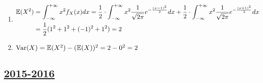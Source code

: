\begin{enumerate}
\begin{enumerate}
\item  \begin{align*}
\operatorname{\mathbb{E}}(X^2) &= \int_{-\infty}^{+\infty} x^2 f_X (x) dx  =
\frac{1}{2} \cdot \int_{-\infty}^{+\infty} x^2 \frac{1}{\sqrt{2\pi}} e^{-\frac{(x-1)^2}{2}} dx  +
\frac{1}{2}  \cdot \int_{-\infty}^{+\infty} x^2 \frac{1}{\sqrt{2\pi}} e^{-\frac{(x+1)^2}{2}} dx \\
&= \frac{1}{2}(1^2 + 1^2 + (-1)^2 + 1^2) =  2
\end{align*}
\item $\operatorname{Var}(X) = \operatorname{\mathbb{E}}(X^2) - (\operatorname{\mathbb{E}}(X))^2 = 2 - 0^2 = 2$
\end{enumerate}
\end{enumerate}



\subsection[2015-2016]{\hyperref[sec:kr_02_2015_2016]{2015-2016}}
\label{sec:sol_kr_02_2015_2016}





